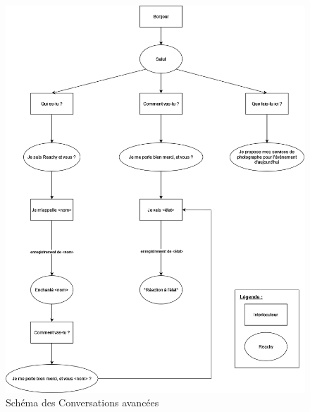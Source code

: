     \begin{figure}[!ht]
        \begin{center}
        \includegraphics[scale = 0.5]{Schema-Conversation.png}
        \caption{Schéma des Conversations avancées}
        \label{fig_conv_avance}
        \end{center}
    \end{figure}
\newpage

